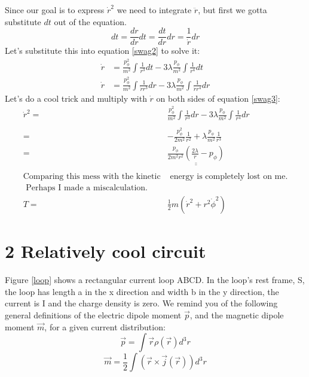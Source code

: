\documentclass{report}
\begin{document}
Since our goal is to express $\dot r ^2$ we need to integrate $\ddot r$, but first we gotta substitute $dt$ out of the equation.
$$dt = \frac{dr}{dr} dt = \frac{dt}{dr} dr = \frac{1}{\dot r} dr$$
Let\rq{}s substitute this into equation \ref{swag2} to solve it:
\begin{align}
 \dot r &= \frac{p_\phi^2}{m^2} \int \frac{1}{r^3}dt   - 3\lambda\frac{p_\phi}{m^2}\int \frac{1}{r^4} dt  \nonumber\\
 \dot r &= \frac{p_\phi^2}{m^2} \int \frac{1}{\dot r r^3}dr   - 3\lambda\frac{p_\phi}{m^2}\int \frac{1}{\dot r r^4} dr  \label{swag3}
\end{align}
Let\rq{}s do a cool trick and multiply with $\dot r$  on both sides of  equation \ref{swag3}:
\begin{align}
 \dot r^2 =& \frac{p_\phi^2}{m^2} \int \frac{1}{ r^3}dr   - 3\lambda\frac{p_\phi}{m^2}\int \frac{1}{ r^4} dr  \nonumber\\
\nonumber\\
 =& -\frac{p_\phi^2}{2m^2}  \frac{1}{ r^2}   + \lambda\frac{p_\phi}{m^2} \frac{1}{ r^3}   \\
=& \underline{\underline{\frac{p_\phi}{2m^2r^2}( \frac{2\lambda}{r} -  p_\phi) }}\\
\nonumber\\
\text{Comparing this mess with the kinetic}&\text{ energy is completely lost on me.}\nonumber\\ 
\text{ Perhaps I made a miscalculation.}\nonumber \ \ \ \ \   \ \ &\\ 
T =& \frac{1}{2}m(\dot r^2 + r^2\dot\phi^2)
\end{align}
\clearpage
\section*{2 Relatively cool circuit}
Figure \ref{loop} shows a rectangular current loop ABCD. In the loop\rq{}s rest frame, S, the loop has length a in the x direction and width b in the y direction, the current is I and the charge density is zero. We remind you of the following general definitions of the electric dipole moment $\vec p$, and the magnetic dipole moment $\vec m$, for a given current distribution: 
\begin{equation}
\vec p = \int \vec r \rho(\vec r) d^3r \label{electric}
\end{equation}
\begin{equation}
\vec m = \frac{1}{2}\int (\vec r \times \vec j(\vec r)) d^3r \label{magnetic}
\end{equation}
\end{document}
